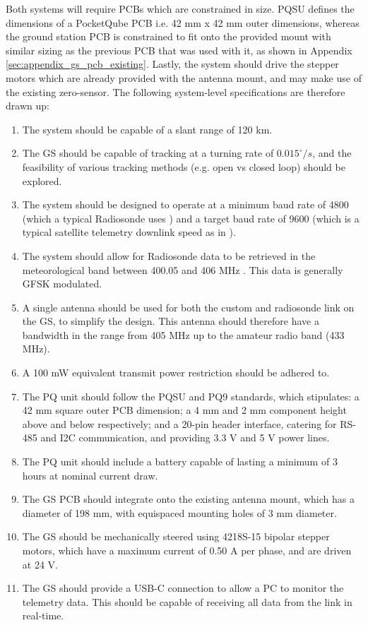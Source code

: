 Both systems will require PCBs which are constrained in size. PQSU defines the dimensions of a PocketQube PCB i.e. 42 mm x 42 mm outer dimensions, whereas the ground station PCB is constrained to fit onto the provided mount with similar sizing as the previous PCB that was used with it, as shown in Appendix \ref{sec:appendix_gs_pcb_existing}. Lastly, the system should drive the stepper motors which are already provided with the antenna mount, and may make use of the existing zero-sensor. The following system-level specifications are therefore drawn up:
\begin{enumerate}
    \item The system should be capable of a slant range of 120 km.
    \item The GS should be capable of tracking at a turning rate of $0.015^\circ / s$, and the feasibility of various tracking methods (e.g. open vs closed loop) should be explored.
    \item The system should be designed to operate at a minimum baud rate of 4800 (which a typical Radiosonde uses \cite{datasheet-iMet54}) and a target baud rate of 9600 (which is a typical satellite telemetry downlink speed as in \cite{paper-deployableAntenna}).
    \item The system should allow for Radiosonde data to be retrieved in the meteorological band between 400.05 and 406 MHz \cite{datasheet-iMet54}. This data is generally GFSK modulated.
    \item A single antenna should be used for both the custom and radiosonde link on the GS, to simplify the design. This antenna should therefore have a bandwidth in the range from 405 MHz up to the amateur radio band (433 MHz).
    \item A 100 mW equivalent transmit power restriction should be adhered to.
    \item The PQ unit should follow the PQSU and PQ9 standards, which stipulates: a 42 mm square outer PCB dimension; a 4 mm and 2 mm component height above and below respectively; and a 20-pin header interface, catering for RS-485 and I2C communication, and providing 3.3 V and 5 V power lines.
    \item The PQ unit should include a battery capable of lasting a minimum of 3 hours at nominal current draw.
    \item The GS PCB should integrate onto the existing antenna mount, which has a diameter of 198 mm, with equispaced mounting holes of 3 mm diameter.
    \item The GS should be mechanically steered using 4218S-15 bipolar stepper motors, which have a maximum current of 0.50 A per phase, and are driven at 24 V.
    \item The GS should provide a USB-C connection to allow a PC to monitor the telemetry data. This should be capable of receiving all data from the link in real-time.
\end{enumerate}